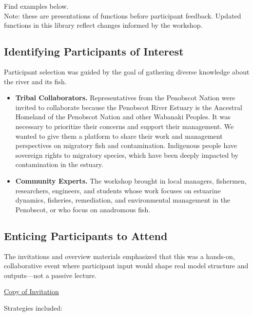 \documentclass[
]{book}
\begin{document}
Find examples below.\\
Note: these are presentations of functions before participant feedback. Updated functions in this library reflect changes informed by the workshop.

\subsection{Identifying Participants of Interest}\label{identifying-participants-of-interest}

Participant selection was guided by the goal of gathering diverse knowledge about the river and its fish.

\begin{itemize}
\item
  \textbf{Tribal Collaborators.} Representatives from the Penobscot Nation were invited to collaborate because the Penobscot River Estuary is the Ancestral Homeland of the Penobscot Nation and other Wabanaki Peoples. It was necessary to prioritize their concerns and support their management. We wanted to give them a platform to share their work and management perspectives on migratory fish and contamination. Indigenous people have sovereign rights to migratory species, which have been deeply impacted by contamination in the estuary.
\item
  \textbf{Community Experts.} The workshop brought in local managers, fishermen, researchers, engineers, and students whose work focuses on estuarine dynamics, fisheries, remediation, and environmental management in the Penobscot, or who focus on anadromous fish.
\end{itemize}

\subsection{Enticing Participants to Attend}\label{enticing-participants-to-attend}

The invitations and overview materials emphasized that this was a hands-on, collaborative event where participant input would shape real model structure and outputs---not a passive lecture.

\href{materials/Penobscot\%20Workshop\%20Overview.pdf}{Copy of Invitation}

Strategies included:
\end{document}
